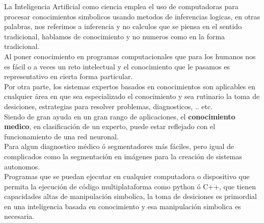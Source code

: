 \documentclass[a4paper, 11pt]{article}
\begin{document}
La Inteligencia Artificial como ciencia emplea el uso de computadoras para procesar conocimientos simbolicos usando metodos de inferencias logicas, en otras palabras, nos referimos a inferencia y no calculos que se piensa en el sentido tradicional, hablamos de conocimiento y no numeros como en la forma tradicional.\\
Al poner conocimiento en programas computacionales que para los humanos nos es fácil o a veces un reto intelectual y el conocimiento que le pasamos es representativo en cierta forma particular.\\

Por otra parte, los sistemas expertos basados en conocimientos son aplicables en cualquier  área en que sea especializado el conocimiento y sea rutinario la toma de desiciones, estrategias para resolver problemas, diagnosticos, .. etc.\\
Siendo de gran ayuda en un gran rango de aplicaciones, el \textbf{conocimiento medico}, en clasificación de un experto, puede estar reflejado con el funcionamiento de una red neuronal.\\

Para algun diagnostico médico ó segmentadores más fáciles, pero igual de complicados como la segmentación en imágenes para la creación de sistemas autonomos.\\

Programas que se puedan ejecutar en cualquier computadora o dispositivo que permita la ejecución de código multiplataforma como python ó C++, que tienen capacidades altas de manipulación simbolica, la toma de desiciones es primordial en una inteligencia basada en conocimiento y esa manipulación simbolica es necesaria.

\pagebreak

\end{document}
